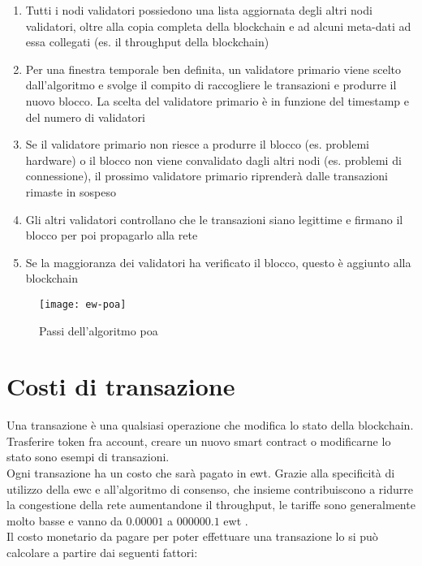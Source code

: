 \begin{enumerate}
    \item Tutti i nodi validatori possiedono una lista aggiornata degli altri nodi validatori, oltre alla copia completa della blockchain e ad alcuni meta-dati ad essa collegati (es. il throughput della blockchain)
    \item Per una finestra temporale ben definita, un validatore primario viene scelto dall'algoritmo e svolge il compito di raccogliere le transazioni e produrre il nuovo blocco. La scelta del validatore primario è in funzione del timestamp e del numero di validatori
    \item Se il validatore primario non riesce a produrre il blocco (es. problemi hardware) o il blocco non viene convalidato dagli altri nodi (es. problemi di connessione), il prossimo validatore primario riprenderà dalle transazioni rimaste in sospeso
    \item Gli altri validatori controllano che le transazioni siano legittime e firmano il blocco per poi propagarlo alla rete
    \item Se la maggioranza dei validatori ha verificato il blocco, questo è aggiunto alla blockchain
\end{enumerate}


\begin{figure}[ht]
    \texttt{[image: ew-poa]}
    \centering
    \caption{Passi dell'algoritmo \gls{poa} \cite{img:ew-poa}}
    \label{lab:ew-poa}
\end{figure}


\section{Costi di transazione}
Una transazione è una qualsiasi operazione che modifica lo stato della blockchain. Trasferire token fra account, creare un nuovo smart contract o modificarne lo stato sono esempi di transazioni. \\
Ogni transazione ha un costo che sarà pagato in \gls{ewt}.
Grazie alla specificità di utilizzo della \gls{ewc} e all'algoritmo di consenso, che insieme contribuiscono a ridurre la congestione della rete aumentandone il throughput,
le tariffe sono generalmente molto basse e vanno da $0.00001$ a $000000.1$ \gls{ewt} \cite{art:manage-costs}. \\
Il costo monetario da pagare per poter effettuare una transazione lo si può calcolare a partire dai seguenti fattori:

